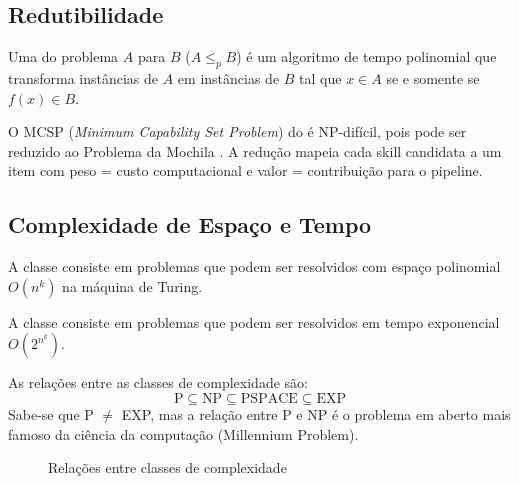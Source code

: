\subsection{Redutibilidade}

\begin{definicao}
    Uma  do problema $A$ para $B$
    ($A \leq_p B$) é um algoritmo de tempo polinomial que transforma
    instâncias de $A$ em instâncias de $B$ tal que $x \in A$ se e somente
    se $f(x) \in B$.
\end{definicao}

\begin{exemplo}
    O MCSP (\textit{Minimum Capability Set Problem}) do \opencodeeco{} é
    NP-difícil, pois pode ser reduzido ao Problema da Mochila
    \cite{opencode2026scanner}. A redução mapeia cada skill candidata a um
    item com peso = custo computacional e valor = contribuição para o
    pipeline.
\end{exemplo}

\subsection{Complexidade de Espaço e Tempo}

\begin{definicao}
    A classe  consiste em problemas que podem ser resolvidos
    com espaço polinomial $O(n^k)$ na máquina de Turing.
\end{definicao}

\begin{definicao}
    A classe  consiste em problemas que podem ser resolvidos em
    tempo exponencial $O(2^{n^k})$.
\end{definicao}

As relações entre as classes de complexidade são:
\[
\text{P} \subseteq \text{NP} \subseteq \text{PSPACE} \subseteq \text{EXP}
\]
Sabe-se que P $\neq$ EXP, mas a relação entre P e NP é o problema em aberto
mais famoso da ciência da computação (Millennium Problem).

\begin{figure}[htb]
    \centering
    \caption{Relações entre classes de complexidade}
    \label{fig:classes-complexidade}
\end{figure}

